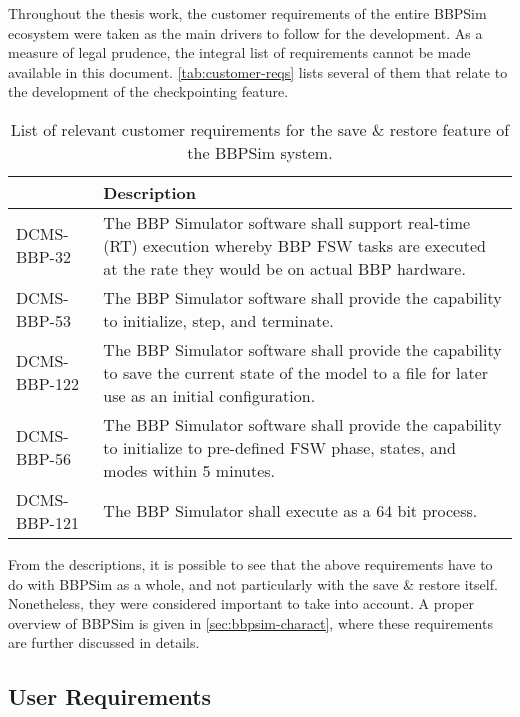 {Throughout the thesis work, the customer requirements of the entire \gls{BBPSim} ecosystem were taken as the main drivers to follow for the development. As a measure of legal prudence, the integral list of requirements cannot be made available in this document. \autoref{tab:customer-reqs} lists several of them that relate to the development of the checkpointing feature.  
\begin{table}[htbp]
	\vspace{12pt}
	\centering
	\begin{tabularx}{\linewidth}{>{\centering}p{3cm} X}
		\toprule
		{\bfseries Requirement\newline Number} & \textbf{Description}\\
		\midrule
		DCMS-BBP-32 & {The BBP Simulator software shall support real-time (RT) execution whereby BBP FSW tasks are executed at the rate they would be on actual BBP hardware.}\\
		\midrule
		DCMS-BBP-53 & {The BBP Simulator software shall provide the capability to initialize, step, and terminate.}\\
		\midrule
		DCMS-BBP-122 & {The BBP Simulator software shall provide the capability to save the current state of the model to a file for later use as an initial configuration.}\\
		\midrule
		DCMS-BBP-56 & {The BBP Simulator software shall provide the capability to initialize to pre-defined FSW phase, states, and modes within 5 minutes.}\\
		\midrule
		DCMS-BBP-121 & {The BBP Simulator shall execute as a 64 bit process.}\\
		\bottomrule
	\end{tabularx}
	\caption{List of relevant customer requirements for the save \& restore feature of the \gls{BBPSim} system.}
	\label{tab:customer-reqs}
\end{table}

From the descriptions, it is possible to see that the above requirements have to do with \gls{BBPSim} as a whole, and not particularly with the save \& restore itself. Nonetheless, they were considered important to take into account. A proper overview of \gls{BBPSim} is given in \autoref{sec:bbpsim-charact}, where these requirements are further discussed in details.

\subsection*{User Requirements}

}
